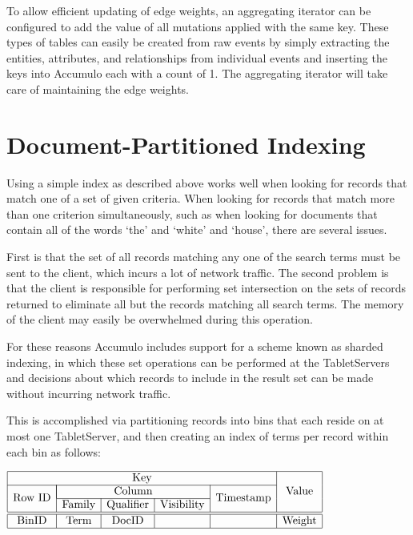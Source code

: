 To allow efficient updating of edge weights, an aggregating iterator can be
configured to add the value of all mutations applied with the same key. These types
of tables can easily be created from raw events by simply extracting the entities,
attributes, and relationships from individual events and inserting the keys into
Accumulo each with a count of 1. The aggregating iterator will take care of
maintaining the edge weights.

\section{Document-Partitioned Indexing}

Using a simple index as described above works well when looking for records that
match one of a set of given criteria. When looking for records that match more than
one criterion simultaneously, such as when looking for documents that contain all of
the words `the' and `white' and `house', there are several issues.

First is that the set of all records matching any one of the search terms must be sent
to the client, which incurs a lot of network traffic. The second problem is that the
client is responsible for performing set intersection on the sets of records returned
to eliminate all but the records matching all search terms. The memory of the client
may easily be overwhelmed during this operation.

For these reasons Accumulo includes support for a scheme known as sharded
indexing, in which these set operations can be performed at the TabletServers and
decisions about which records to include in the result set can be made without
incurring network traffic.

This is accomplished via partitioning records into bins that each reside on at most
one TabletServer, and then creating an index of terms per record within each bin as
follows:

\begin{center}
$\begin{array}{|c|c|c|c|c|c|} \hline
\multicolumn{5}{|c|}{\mbox{Key}} & \multirow{3}{*}{\mbox{Value}}\\ \cline{1-5}
\multirow{2}{*}{\mbox{Row ID}}& \multicolumn{3}{|c|}{\mbox{Column}} & \multirow{2}{*}{\mbox{Timestamp}} & \\ \cline{2-4}
& \mbox{Family} & \mbox{Qualifier} & \mbox{Visibility} & & \\ \hline \hline
\mbox{BinID} & \mbox{Term} & \mbox{DocID} & & & \mbox{Weight} \\ \hline
\end{array}$
\end{center}


